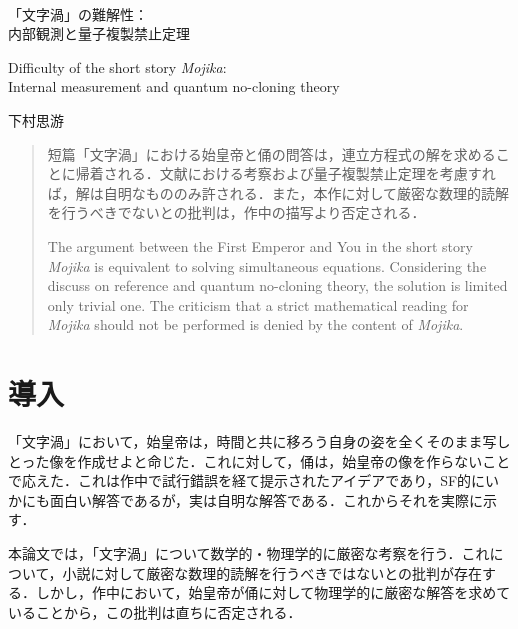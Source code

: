 \documentclass[10pt, a5paper, twoside]{jsarticle}
\theoremstyle{definition}
\begin{document}
	{\Large 　} %

	\begin{center}

		\Large{「文字渦」の難解性： \\ 内部観測と量子複製禁止定理}

		\vspace{3mm}

		\large{Difficulty of the short story \textit{Mojika}: \\ Internal measurement and quantum no-cloning theory}

		\vspace{3mm}
		
		\large{下村思游}

	\end{center}

	\vspace{3mm}

	\begin{abstract}

		短篇「文字渦」における始皇帝と俑の問答は，連立方程式の解を求めることに帰着される．文献\cite{sshimo}における考察および量子複製禁止定理を考慮すれば，解は自明なもののみ許される．また，本作に対して厳密な数理的読解を行うべきでないとの批判は，作中の描写より否定される．

		\vspace{3mm}

		The argument between the First Emperor and You in the short story \textit{Mojika} is equivalent to solving simultaneous equations. Considering the discuss on reference \cite{sshimo} and quantum no-cloning theory, the solution is limited only trivial one. The criticism that a strict mathematical reading for \textit{Mojika} should not be performed is denied by the content of \textit{Mojika}.

	\end{abstract}

	\section{導入}

		「文字渦」において，始皇帝は，時間と共に移ろう自身の姿を全くそのまま写しとった像を作成せよと命じた．これに対して，俑は，始皇帝の像を作らないことで応えた．これは作中で試行錯誤を経て提示されたアイデアであり，SF的にいかにも面白い解答であるが，実は自明な解答である．これからそれを実際に示す．

		本論文では，「文字渦」について数学的・物理学的に厳密な考察を行う．これについて，小説に対して厳密な数理的読解を行うべきではないとの批判が存在する．しかし，作中において，始皇帝が俑に対して物理学的に厳密な解答を求めていることから，この批判は直ちに否定される．
\end{document}
